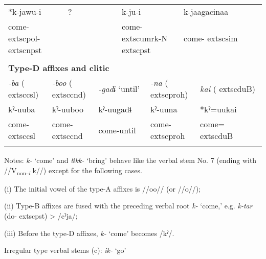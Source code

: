 \begin{tabularx}{\textwidth}{XXXXXXXXXXXXXXXXXXXXX}
\multicolumn{4}{X}{{ *k-jawu-i}} & \multicolumn{4}{X}{{ ?}} & \multicolumn{3}{X}{k-ju-i} & \multicolumn{10}{X}{{ k-jaagacinaa}}\\
\multicolumn{4}{X}{come-	extsc{pol}-	extsc{npst}} & \multicolumn{4}{X}{} & \multicolumn{3}{X}{come-	extsc{umrk}-N	extsc{pst}} & \multicolumn{10}{X}{come-	extsc{sim}}\\
\multicolumn{21}{X}{}\\
\multicolumn{21}{X}{{\bfseries Type-D affixes and clitic}}\\
\multicolumn{3}{X}{{ \textit{{}-ba} (	extsc{csl})}} & \multicolumn{3}{X}{{ \textit{{}-boo} (	extsc{cnd})}} & \multicolumn{3}{X}{{ \textit{{}-gadɨ} ‘until’}} & \multicolumn{4}{X}{{ \textit{{}-na} (	extsc{proh})}} & \multicolumn{8}{X}{{ \textit{kai} (	extsc{du}B)}}\\
\multicolumn{3}{X}{{ kˀ-uuba}} & \multicolumn{3}{X}{{ kˀ-uuboo}} & \multicolumn{3}{X}{{ kˀ-uugadɨ}} & \multicolumn{4}{X}{{ kˀ-uuna}} & \multicolumn{8}{X}{{ *kˀ=uukai}}\\
\multicolumn{3}{X}{come-	extsc{csl}} & \multicolumn{3}{X}{come-	extsc{cnd}} & \multicolumn{3}{X}{come-until} & \multicolumn{4}{X}{come-	extsc{proh}} & \multicolumn{8}{X}{come=	extsc{du}B}\\
\lspbottomrule
\end{tabularx}
Notes: \textit{k-} ‘come’ and \textit{tɨkk-} ‘bring’ behave like the verbal stem No. 7 (ending with //V\textsubscript{non-}\textit{\textsubscript{i}} k//) except for the following cases.

(i)  The initial vowel of the type-A affixes is //oo// (or //o//);

(ii)  Type-B affixes are fused with the preceding verbal root \textit{k-} ‘come,’ e.g. \textit{k-tar} (do-	extsc{pst}) > /cˀja/;

(iii)  Before the type-D affixes, \textit{k-} ‘come’ becomes /kˀ/.

Irregular type verbal stems (c): \textit{ik-} ‘go’

\tablefirsthead{}

